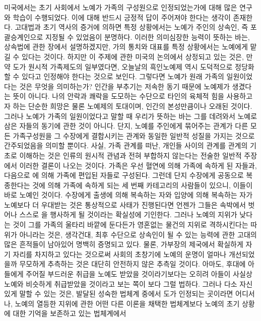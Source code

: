미국에서는
초기 사회에서 노예가 가족의 구성원으로 인정되었는가에 대해
많은 연구와 학습이
수행되었다.
이에 대해 반드시 긍정적 답이 주어져야 한다는 생각이 존재한다.
고대법과 초기 역사의 증거에 의하면
특정 상황에서는 노예가 주인의 상속인, 즉 포괄승계인으로 지정될 수 있었음이
분명하다.
이러한 의미심장한 능력이 뜻하는 바는,
상속법에 관한 장에서 설명하겠지만,
가의 통치와 대표를 특정 상황에서는 노예에게 맡길 수 있다는 것이다.
하지만 이 주제에 관한 미국의 논의에서 상정되고 있는 것은,
만약 도가 원시적 가족제도의 일부였다면,
오늘날의 흑인노예제 역시 도덕적으로 정당화할 수 있다고 인정해야
한다는 것으로 보인다.
그렇다면 노예가 원래 가족의 일원이었다는 것은 무엇을 의미하는가?
인간을 부추기는 저속한 동기 때문에 노예제가 생겼다는 뜻이 아니다.
나의 안락과 쾌락을 도모하는 수단으로 타인의 육체적 힘을 사용하고자 하는
단순한 희망은 물론 노예제의 토대이며,
인간의 본성만큼이나 오래된 것이다.
그러나 노예가 가족의 일원이었다고 말할 때 우리가 뜻하는 바는
그를 데려와서 노예로 삼은 자들의 동기에 관한 것이 아니다.
단지,
노예를 주인에게 묶어주는 관계가
다른 모든 가족구성원을 그 수장에게 결합시키는
관계와 동일한 일반적 성질을 가지는 것으로 간주되었음을 의미할 뿐이다.
사실,
가족 관계를 떠난, 개인들 사이의 관계를
관계의 기초로 이해하는 것은
인류의 원시적 관념과
전혀 부합하지 않는다는
전술한 일반적 주장에서 이러한 결론이 나오는 것이다.
가족은 우선 혈연에 의해 가족에 속하게 된 자들과,
다음으로 에 의해 가족에 편입된 자들로 구성된다.
그런데
단지 수장에게 공동으로 복종한다는 것에 의해 가족에 속하게 되는
세 번째 카테고리의 사람들이 있으니,
이들이 바로 노예인 것이다.
수장에게 출생에 의해 복속하는 자와 입양에 의해 복속하는 자가
노예보다 더 우대받는 것은 통상적으로 사태가 진행된다면
언젠가 그들은 속박에서 벗어나 스스로 을 행사하게 될 것이라는
확실성에 기인한다.
그러나 노예의 지위가 낮다는 것이
그를 가족의 울타리 바깥에 둔다든가
영혼없는 물건의 지위로 격하시킨다는 따위가 아니라는 것은,
생각건대,
최후 수단으로 상속인이 될 수 있는 능력에 관한
고대의 많은 흔적들이 남아있어
명백히 증명되고 있다.
물론,
가부장의 제국에서 확실하게 자기 자리를 차지하고 있다는 것으로써
사회의 초창기에 노예의 운명이 얼마나 개선되었을까 무모하게 추측하는 것은
대단히 안전하지 않은 추측일 것이다.
아마도,
후대에 아들에게 주어질 부드러운 취급을 노예도 받았을 것이라기보다는
오히려 아들이 사실상 노예와 비슷하게 취급받았을 것이라고 보는 쪽이
보다 그럴 법하다.
그러나
다소 자신있게 말할 수 있는 것은,
발달된 성숙한 법체계 중에서
도가 인정되는 곳이라면 어디서나,
노예의 열등한 지위에 관한 어떤 다른 이론을 채택한 법체계보다
노예의 초기 상황에 대한 기억을 보존하고 있는 법체계에서
